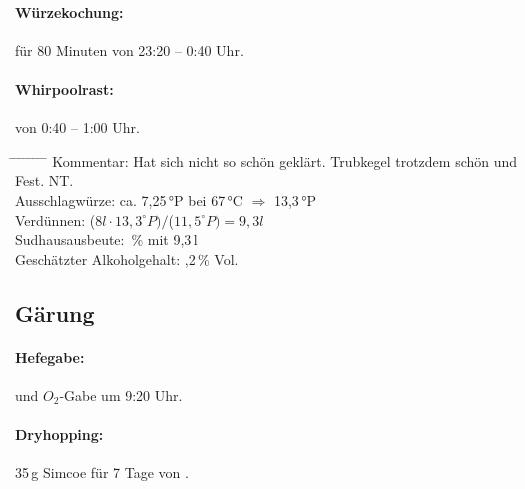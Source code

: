 \documentclass[12pt,oneside,a4paper]{scrartcl}
\begin{document}
{\paragraph{Würzekochung:} für 80 Minuten von 23:20 -- 0:40 Uhr.\\
\paragraph{Whirpoolrast:} von 0:40 -- 1:00 Uhr.
	\begin{tabbing}
		\hspace{1cm} \= \hspace{1cm} \= \hspace{1cm} \= \hspace{1cm} \= \hspace{1cm} \= \hspace{1cm} \= \hspace{1cm} \= \hspace{1cm} \= \kill
		\> Kommentar: \>\>\> Hat sich nicht so schön geklärt. Trubkegel trotzdem schön und Fest. NT.\\
		\> \> Ausschlagwürze: \> \> \> \> \> ca. 7,25\,°P bei 67\,°C $\Rightarrow$ 13,3\,°P\\
		\> \> Verdünnen: \> \> \> \> \> ($8l \cdot$$ 13,3^\circ P)/$($11,5^\circ P)= 9,3l$\\
		\> \> Sudhausausbeute: \> \> \> \> \,\% mit 9,3\,l\\
		\> \> Geschätzter Alkoholgehalt: \> \> \> \> ,2\,\% Vol.
	\end{tabbing}
%
\subsection*{Gärung}
\paragraph{Hefegabe:} und $O_2$-Gabe um 9:20 Uhr.
\paragraph{Dryhopping:} 35\,g Simcoe für 7 Tage von .
%
}
\end{document}
